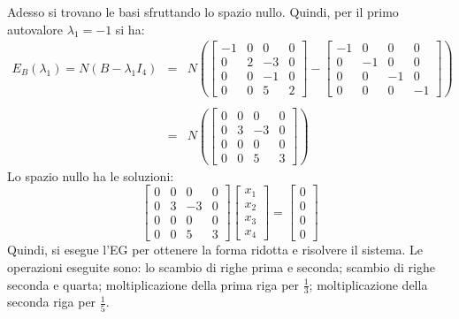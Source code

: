 \documentclass[a4paper]{article}
\begin{document}
	\noindent
	Adesso si trovano le basi sfruttando lo spazio nullo. Quindi, per il primo autovalore $\lambda_{1} = -1$ si ha:
	\begin{equation*}
		\begin{array}{lll}
			E_{B}\left(\lambda_{1}\right) = N\left(B - \lambda_{1}I_{4}\right) & = & N\left(
			\begin{bmatrix}
				-1 & 0 & 0 & 0 	\\
				0 & 2 & -3 & 0 	\\
				0 & 0 & -1 & 0 	\\
				0 & 0 & 5 & 2
			\end{bmatrix} - \begin{bmatrix}
				-1 & 0 & 0 & 0 	\\
				0 & -1 & 0 & 0 	\\
				0 & 0 & -1 & 0 	\\
				0 & 0 & 0 & -1
			\end{bmatrix}\right) \\
			\\
			& = & N\left(
			\begin{bmatrix}
				0 & 0 & 0 & 0 	\\
				0 & 3 & -3 & 0 	\\
				0 & 0 & 0 & 0 	\\
				0 & 0 & 5 & 3
			\end{bmatrix}\right)
		\end{array}
	\end{equation*}
	Lo spazio nullo ha le soluzioni:
	\begin{equation*}
		\begin{bmatrix}
			0 & 0 & 0 & 0 	\\
			0 & 3 & -3 & 0 	\\
			0 & 0 & 0 & 0 	\\
			0 & 0 & 5 & 3
		\end{bmatrix} \begin{bmatrix}
			x_{1} \\
			x_{2} \\
			x_{3} \\
			x_{4}
		\end{bmatrix} = \begin{bmatrix}
			0 \\
			0 \\
			0 \\
			0
		\end{bmatrix}
	\end{equation*}
	Quindi, si esegue l'EG per ottenere la forma ridotta e risolvere il sistema. Le operazioni eseguite sono: lo scambio di righe prima e seconda; scambio di righe seconda e quarta; moltiplicazione della prima riga per $\frac{1}{3}$; moltiplicazione della seconda riga per $\frac{1}{5}$.
\end{document}
